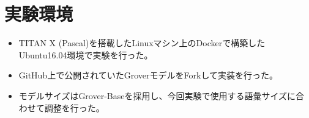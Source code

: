 \appendix
\section{実験環境}
\label{app:settings}
\begin{itemize}
    \item TITAN X (Pascal)を搭載したLinuxマシン上のDockerで構築したUbuntu16.04環境で実験を行った。
    \item GitHub上で公開されていたGroverモデルをForkして実装を行った。
    \item モデルサイズはGrover-Baseを採用し、今回実験で使用する語彙サイズに合わせて調整を行った。
\end{itemize}